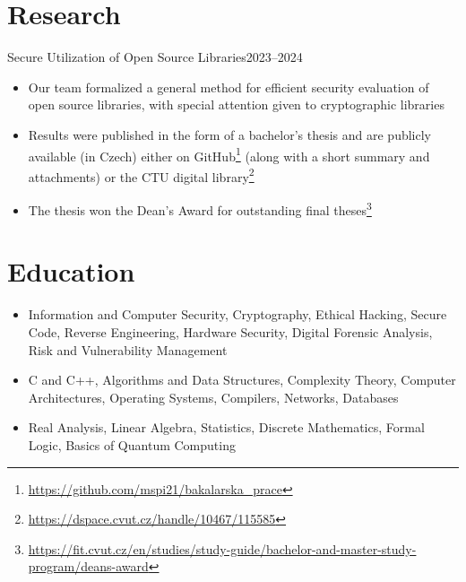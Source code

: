 \documentclass{customcv}
\begin{document}
\section{Research}
        {Secure Utilization of Open Source Libraries}{2023--2024}
    \begin{itemize}
        \item Our team formalized a general method for efficient security evaluation of open source libraries,
        with special attention given to cryptographic libraries
        
        \item Results were published in the form of a bachelor’s thesis and are publicly available (in Czech) either
        on GitHub\footnote{\url{https://github.com/mspi21/bakalarska_prace}} (along with a short summary and
        attachments) or the CTU digital library\footnote{\url{https://dspace.cvut.cz/handle/10467/115585}}
        
        \item The thesis won the Dean's Award for outstanding final theses\footnote{\url{https://fit.cvut.cz/en/studies/study-guide/bachelor-and-master-study-program/deans-award}}
    \end{itemize}

\section{Education}
    
    \begin{itemize}
      \item Information and Computer Security, Cryptography, Ethical Hacking, Secure Code, Reverse Engineering, Hardware Security, Digital Forensic Analysis, Risk and Vulnerability Management

      \item C and C++, Algorithms and Data Structures, Complexity Theory, Computer Architectures, Operating Systems, Compilers, Networks, Databases

      \item Real Analysis, Linear Algebra, Statistics, Discrete Mathematics, Formal Logic,
      Basics of Quantum Computing
    \end{itemize}
\end{document}
